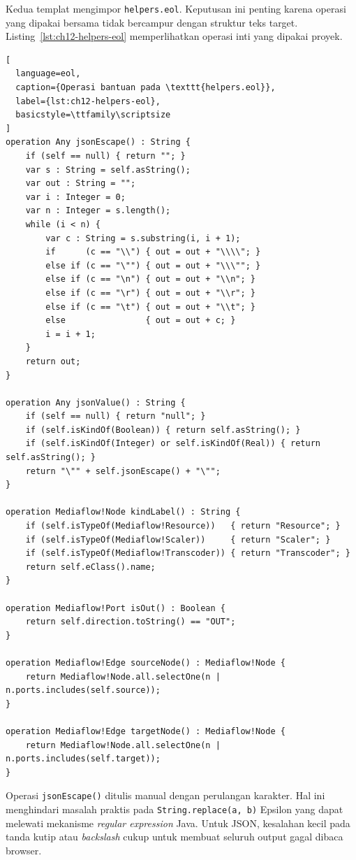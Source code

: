 Kedua templat mengimpor \texttt{helpers.eol}. Keputusan ini penting karena operasi yang dipakai bersama tidak bercampur dengan struktur teks target. Listing~\ref{lst:ch12-helpers-eol} memperlihatkan operasi inti yang dipakai proyek.

\begin{lstlisting}[
  language=eol,
  caption={Operasi bantuan pada \texttt{helpers.eol}},
  label={lst:ch12-helpers-eol},
  basicstyle=\ttfamily\scriptsize
]
operation Any jsonEscape() : String {
    if (self == null) { return ""; }
    var s : String = self.asString();
    var out : String = "";
    var i : Integer = 0;
    var n : Integer = s.length();
    while (i < n) {
        var c : String = s.substring(i, i + 1);
        if      (c == "\\") { out = out + "\\\\"; }
        else if (c == "\"") { out = out + "\\\""; }
        else if (c == "\n") { out = out + "\\n"; }
        else if (c == "\r") { out = out + "\\r"; }
        else if (c == "\t") { out = out + "\\t"; }
        else                { out = out + c; }
        i = i + 1;
    }
    return out;
}

operation Any jsonValue() : String {
    if (self == null) { return "null"; }
    if (self.isKindOf(Boolean)) { return self.asString(); }
    if (self.isKindOf(Integer) or self.isKindOf(Real)) { return self.asString(); }
    return "\"" + self.jsonEscape() + "\"";
}

operation Mediaflow!Node kindLabel() : String {
    if (self.isTypeOf(Mediaflow!Resource))   { return "Resource"; }
    if (self.isTypeOf(Mediaflow!Scaler))     { return "Scaler"; }
    if (self.isTypeOf(Mediaflow!Transcoder)) { return "Transcoder"; }
    return self.eClass().name;
}

operation Mediaflow!Port isOut() : Boolean {
    return self.direction.toString() == "OUT";
}

operation Mediaflow!Edge sourceNode() : Mediaflow!Node {
    return Mediaflow!Node.all.selectOne(n | n.ports.includes(self.source));
}

operation Mediaflow!Edge targetNode() : Mediaflow!Node {
    return Mediaflow!Node.all.selectOne(n | n.ports.includes(self.target));
}
\end{lstlisting}

Operasi \texttt{jsonEscape()} ditulis manual dengan perulangan karakter. Hal ini menghindari masalah praktis pada \texttt{String.replace(a, b)} Epsilon yang dapat melewati mekanisme \textit{regular expression} Java. Untuk JSON, kesalahan kecil pada tanda kutip atau \textit{backslash} cukup untuk membuat seluruh output gagal dibaca browser.

